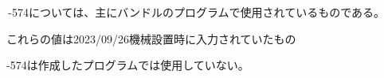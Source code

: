 \clearpage
\,-\ttNum574については、主にバンドルのプログラムで使用されているものである。
\begin{marker}
これらの値は2023/09/26機械設置時に入力されていたもの
\end{marker}
\begin{marker}
-\ttNum574は作成したプログラムでは使用していない。
\end{marker}

